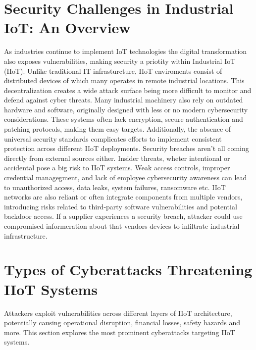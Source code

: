 \documentclass[article,a4paper]{IEEEtran}
\begin{document}
\section{Security Challenges in Industrial IoT: An Overview}
As industries continue to implement IoT technologies the digital transformation also exposes vulnerabilities, making security a priotity within Industrial IoT (IIoT). Unlike traditional IT infrasturcture, IIoT enviroments consist of distributed devices of which many operates in remote industrial locations. This decentralization creates a wide attack surface being more difficult to monitor and defend against cyber threats. 
\newline\newline
Many industrial machinery also rely on outdated hardware and software, originally designed with less or no modern cybersecurity considerations. These systems often lack encryption, secure authentication and patching protocols, making them easy targets. Additionally, the absence of universal security standards complicates efforts to implement consistent protection across different IIoT deployments. Security breaches aren't all coming directly from external sources either. Insider threats, wheter intentional or accidental pose a big risk to IIoT systems. Weak access controls, improper credential managegment, and lack of employee cybersecurity awareness can lead to unauthorized access, data leaks, system failures, ransomware etc. 
\newline\newline
IIoT networks are also reliant or often integrate components from multiple vendors, introducing risks related to third-party software vulnerabilities and potential backdoor access. If a supplier experiences a security breach, attacker could use compromised informeration about that vendors devices to infiltrate industrial infrastructure.
\section{Types of Cyberattacks Threatening IIoT Systems}
Attackers exploit vulnerabilities across different layers of IIoT architecture, potentially causing operational disruption, financial losses, safety hazards and more. This section explores the most prominent cyberattacks targeting IIoT systems. 
\end{document}
